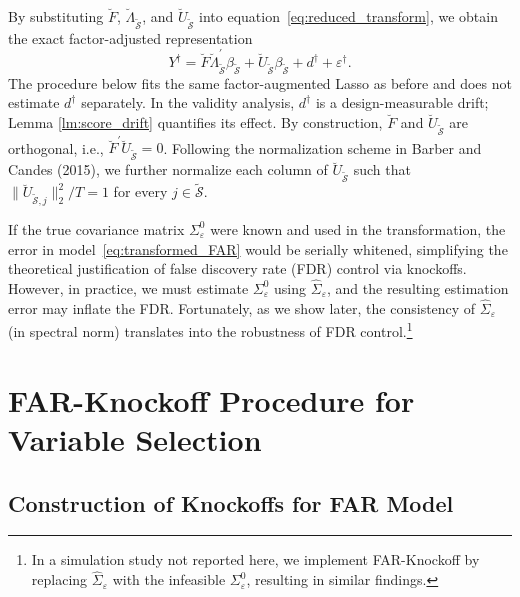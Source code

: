 ﻿\documentclass[12pt]{article}
\newcommand{\0}{\mbox{\bf 0}}
\theoremstyle{plain}%
\theoremstyle{definition}
\begin{document}
By substituting $\breve{F}$, $\breve{\Lambda}_{\widetilde{\mathcal{S}}}$, and $\breve{U}_{\widetilde{\mathcal{S}}}$ into equation~\eqref{eq:reduced_transform}, we obtain the exact factor-adjusted representation
\begin{equation}
Y^{\dagger}
=\breve{F}\breve{\Lambda}_{\widetilde{\mathcal{S}}}^{\prime}
\beta_{\widetilde{\mathcal{S}}}
+\breve{U}_{\widetilde{\mathcal{S}}}\beta_{\widetilde{\mathcal{S}}}
+d^\dagger+\varepsilon^{\dagger}.
\label{eq:transformed_FAR}
\end{equation}
The procedure below fits the same factor-augmented Lasso as before and does
not estimate $d^\dagger$ separately.  In the validity analysis,
$d^\dagger$ is a design-measurable drift; Lemma
\ref{lm:score_drift} quantifies its effect.
By construction, $\breve{F}$ and $\breve{U}_{\widetilde{\mathcal{S}}}$ are orthogonal, i.e., $\breve{F}^{\prime} \breve{U}_{\widetilde{\mathcal{S}}} = 0$. Following the normalization scheme in Barber and Candes (2015), we further normalize each column of $\breve{U}_{\widetilde{\mathcal{S}}}$ such that $\|\breve{U}_{\widetilde{\mathcal{S}}, j}\|_2^2 / T = 1$ for every $j \in \widetilde{\mathcal{S}}$.

If the true covariance matrix $\Sigma_{\varepsilon}^{0}$ were known and used in the transformation, the error in model~\eqref{eq:transformed_FAR} would be serially whitened, simplifying the theoretical justification of false discovery rate (FDR) control via knockoffs. However, in practice, we must estimate $\Sigma_{\varepsilon}^{0}$ using $\widehat{\Sigma}_{\varepsilon}$, and the resulting estimation error may inflate the FDR. Fortunately, as we show later, the consistency of $\widehat{\Sigma}_{\varepsilon}$ (in spectral norm) translates into the robustness of FDR control.\footnote{In a simulation study not reported here, we implement FAR-Knockoff by replacing $\widehat{\Sigma}_{\varepsilon}$ with the infeasible $\Sigma_{\varepsilon}^{0}$, resulting in similar findings.} 
 






\section{FAR-Knockoff Procedure for Variable Selection}
\label{sec:FAR-Knockoff}


\subsection{Construction of Knockoffs for FAR Model}
\label{sec:knockoff}
\end{document}
